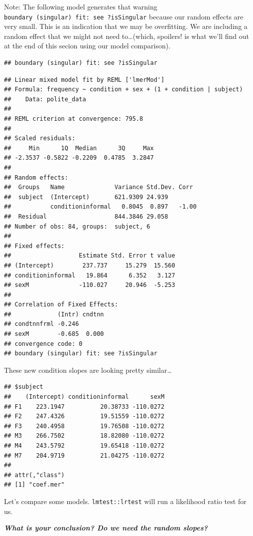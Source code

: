 \documentclass[
  openany]{book}
\begin{document}
Note: The following model generates that warning \texttt{boundary\ (singular)\ fit:\ see\ ?isSingular} because our random effects are very small. This is an indication that we may be overfitting. We are including a random effect that we might not need to\ldots(which, spoilers! is what we'll find out at the end of this secion using our model comparison).

\begin{verbatim}
## boundary (singular) fit: see ?isSingular
\end{verbatim}

\begin{verbatim}
## Linear mixed model fit by REML ['lmerMod']
## Formula: frequency ~ condition + sex + (1 + condition | subject)
##    Data: polite_data
## 
## REML criterion at convergence: 795.8
## 
## Scaled residuals: 
##     Min      1Q  Median      3Q     Max 
## -2.3537 -0.5822 -0.2209  0.4785  3.2847 
## 
## Random effects:
##  Groups   Name              Variance Std.Dev. Corr 
##  subject  (Intercept)       621.9309 24.939        
##           conditioninformal   0.8045  0.897   -1.00
##  Residual                   844.3846 29.058        
## Number of obs: 84, groups:  subject, 6
## 
## Fixed effects:
##                   Estimate Std. Error t value
## (Intercept)        237.737     15.279  15.560
## conditioninformal   19.864      6.352   3.127
## sexM              -110.027     20.946  -5.253
## 
## Correlation of Fixed Effects:
##             (Intr) cndtnn
## condtnnfrml -0.246       
## sexM        -0.685  0.000
## convergence code: 0
## boundary (singular) fit: see ?isSingular
\end{verbatim}

These new condition slopes are looking pretty similar\ldots{}

\begin{verbatim}
## $subject
##    (Intercept) conditioninformal      sexM
## F1    223.1947          20.38733 -110.0272
## F2    247.4326          19.51559 -110.0272
## F3    240.4958          19.76508 -110.0272
## M3    266.7502          18.82080 -110.0272
## M4    243.5792          19.65418 -110.0272
## M7    204.9719          21.04275 -110.0272
## 
## attr(,"class")
## [1] "coef.mer"
\end{verbatim}

Let's compare some models. \texttt{lmtest::lrtest} will run a likelihood ratio test for us.

\textbf{\emph{What is your conclusion? Do we need the random slopes?}}
\end{document}
